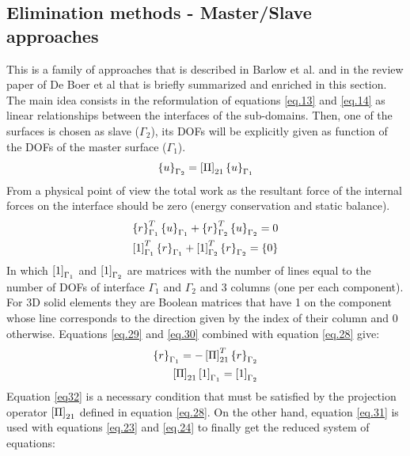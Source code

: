   \subsection{Elimination methods - Master/Slave  approaches}\label{ssec33}
  This is a family of approaches that is described in Barlow et al. \cite{barlow1982constraint} and in the review paper of De Boer et al \cite{de2007review} that is briefly summarized and enriched in this section. The main idea consists in the reformulation of equations \eqref{eq.13} and \eqref{eq.14} as linear relationships between the interfaces of the sub-domains. Then, one of the surfaces is chosen as slave ($\Gamma_2$), its DOFs will be explicitly given as function of the DOFs of the master surface ($\Gamma_1$).  
  \begin{equation}
  \label{eq.28}
  \left\lbrace{u}\right \rbrace_{\Gamma_2}=\left[{\Pi}\right]_{21}\left\lbrace{u}\right \rbrace_{\Gamma_1}
  \end{equation}
  From a physical point of view the total work as the resultant force  of the internal forces on the interface should be zero (energy conservation and static balance).
  \begin{eqnarray}
  \label{eq.29}
  \left\lbrace{r}\right \rbrace_{\Gamma_1}^T\left\lbrace{u}\right \rbrace_{\Gamma_1}+\left\lbrace{r}\right \rbrace_{\Gamma_2}^T\left\lbrace{u}\right \rbrace_{\Gamma_2}=0\\
  \label{eq.30}
  \left[{1}\right]_{\Gamma_1}^T\left\lbrace{r}\right \rbrace_{\Gamma_1}+\left[{1}\right]_{\Gamma_2}^T\left\lbrace{r}\right \rbrace_{\Gamma_2}=\left\lbrace{0}\right \rbrace
  \end{eqnarray}
  In which $\left[{1}\right]_{\Gamma_1}$ and $\left[{1}\right]_{\Gamma_2}$ are matrices with the number of lines equal to the number of DOFs of interface ${\Gamma_1}$ and ${\Gamma_2}$ and 3 columns (one per each component). For 3D solid elements they are Boolean matrices that have 1 on the component whose line corresponds to the direction given by the index of their column and 0 otherwise. 
   Equations \eqref{eq.29} and \eqref{eq.30} combined with equation \eqref{eq.28} give:
  \begin{eqnarray}
  \label{eq.31}
  \left\lbrace{r}\right \rbrace_{\Gamma_1}=-\left[{\Pi}\right]_{21}^T\left\lbrace{r}\right \rbrace_{\Gamma_2}\\
  \label{eq32}
  \left[{\Pi}\right]_{21}\left[{1}\right]_{\Gamma_1}=\left[{1}\right]_{\Gamma_2}
  \end{eqnarray}
  Equation \eqref{eq32} is a necessary condition that must be satisfied by the projection operator $\left[{\Pi}\right]_{21}$ defined in equation \eqref{eq.28}. On the other hand, equation \eqref{eq.31} is used with equations \eqref{eq.23} and \eqref{eq.24} to finally get the reduced system of equations:

